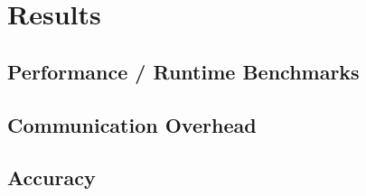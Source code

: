 \chapter{Results}
\section{Performance / Runtime Benchmarks}
\section{Communication Overhead}
\section{Accuracy}
